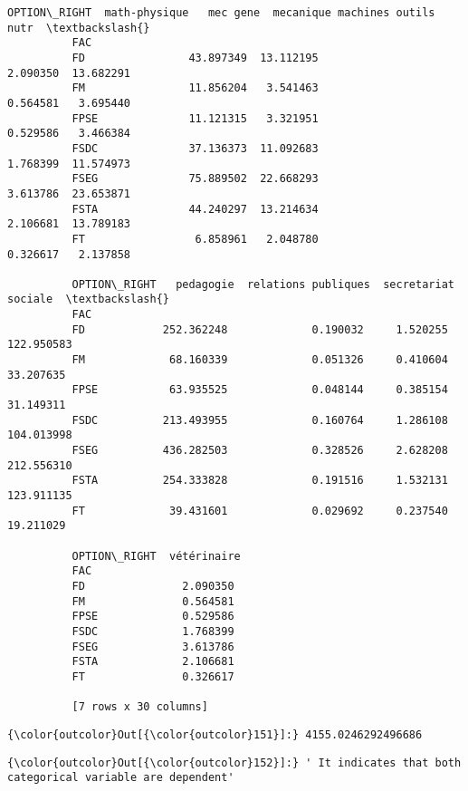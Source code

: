 \documentclass[11pt]{article}
\begin{document}
\begin{Verbatim}[commandchars=\\\{\}]
          OPTION\_RIGHT  math-physique   mec gene  mecanique machines outils       nutr  \textbackslash{}
          FAC                                                                            
          FD                43.897349  13.112195                   2.090350  13.682291   
          FM                11.856204   3.541463                   0.564581   3.695440   
          FPSE              11.121315   3.321951                   0.529586   3.466384   
          FSDC              37.136373  11.092683                   1.768399  11.574973   
          FSEG              75.889502  22.668293                   3.613786  23.653871   
          FSTA              44.240297  13.214634                   2.106681  13.789183   
          FT                 6.858961   2.048780                   0.326617   2.137858   
          
          OPTION\_RIGHT   pedagogie  relations publiques  secretariat     sociale  \textbackslash{}
          FAC                                                                      
          FD            252.362248             0.190032     1.520255  122.950583   
          FM             68.160339             0.051326     0.410604   33.207635   
          FPSE           63.935525             0.048144     0.385154   31.149311   
          FSDC          213.493955             0.160764     1.286108  104.013998   
          FSEG          436.282503             0.328526     2.628208  212.556310   
          FSTA          254.333828             0.191516     1.532131  123.911135   
          FT             39.431601             0.029692     0.237540   19.211029   
          
          OPTION\_RIGHT  vétérinaire  
          FAC                        
          FD               2.090350  
          FM               0.564581  
          FPSE             0.529586  
          FSDC             1.768399  
          FSEG             3.613786  
          FSTA             2.106681  
          FT               0.326617  
          
          [7 rows x 30 columns]
\end{Verbatim}
        
            \begin{Verbatim}[commandchars=\\\{\}]
{\color{outcolor}Out[{\color{outcolor}151}]:} 4155.0246292496686
\end{Verbatim}
        
            \begin{Verbatim}[commandchars=\\\{\}]
{\color{outcolor}Out[{\color{outcolor}152}]:} ' It indicates that both categorical variable are dependent'
\end{Verbatim}
        
\end{document}
